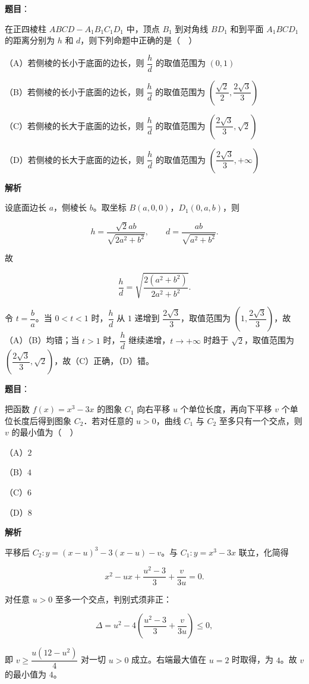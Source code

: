 \begin{answer}

\textbf{题目}：

在正四棱柱 $ABCD-A_1B_1C_1D_1$ 中，顶点 $B_1$ 到对角线 $BD_1$ 和到平面 $A_1BCD_1$ 的距离分别为 $h$ 和 $d$，则下列命题中正确的是（　）

（A）若侧棱的长小于底面的边长，则 $\dfrac hd$ 的取值范围为 $(0,1)$

（B）若侧棱的长小于底面的边长，则 $\dfrac hd$ 的取值范围为 $\left(\dfrac{\sqrt2}2,\dfrac{2\sqrt3}3\right)$

（C）若侧棱的长大于底面的边长，则 $\dfrac hd$ 的取值范围为 $\left(\dfrac{2\sqrt3}3,\sqrt2\right)$

（D）若侧棱的长大于底面的边长，则 $\dfrac hd$ 的取值范围为 $\left(\dfrac{2\sqrt3}3,+\infty\right)$

\textbf{解析}

设底面边长 $a$，侧棱长 $b$。取坐标 $B(a,0,0)$，$D_1(0,a,b)$，则

\nopagebreak[4]
\[h=\frac{\sqrt2ab}{\sqrt{2a^2+b^2}},\qquad d=\frac{ab}{\sqrt{a^2+b^2}}.\]

故

\nopagebreak[4]
\[\frac hd=\sqrt{\frac{2(a^2+b^2)}{2a^2+b^2}}.\]

令 $t=\dfrac ba$。当 $0<t<1$ 时，$\dfrac hd$ 从 $1$ 递增到 $\dfrac{2\sqrt3}3$，取值范围为 $\left(1,\dfrac{2\sqrt3}3\right)$，故（A）（B）均错；当 $t>1$ 时，$\dfrac hd$ 继续递增，$t\to+\infty$ 时趋于 $\sqrt2$，取值范围为 $\left(\dfrac{2\sqrt3}3,\sqrt2\right)$，故（C）正确，（D）错。


\end{answer}
\begin{answer}

\textbf{题目}：

把函数 $f(x)=x^3-3x$ 的图象 $C_1$ 向右平移 $u$ 个单位长度，再向下平移 $v$ 个单位长度后得到图象 $C_2$．若对任意的 $u>0$，曲线 $C_1$ 与 $C_2$ 至多只有一个交点，则 $v$ 的最小值为（　）

（A）$2$

（B）$4$

（C）$6$

（D）$8$

\textbf{解析}

平移后 $C_2:y=(x-u)^3-3(x-u)-v$。与 $C_1:y=x^3-3x$ 联立，化简得

\nopagebreak[4]
\[x^2-ux+\frac{u^2-3}3+\frac v{3u}=0.\]

对任意 $u>0$ 至多一个交点，判别式须非正：

\nopagebreak[4]
\[\Delta=u^2-4\left(\frac{u^2-3}3+\frac v{3u}\right)\leqslant0,\]

即 $v\geqslant\dfrac{u(12-u^2)}4$ 对一切 $u>0$ 成立。右端最大值在 $u=2$ 时取得，为 $4$。故 $v$ 的最小值为 $4$。


\end{answer}
